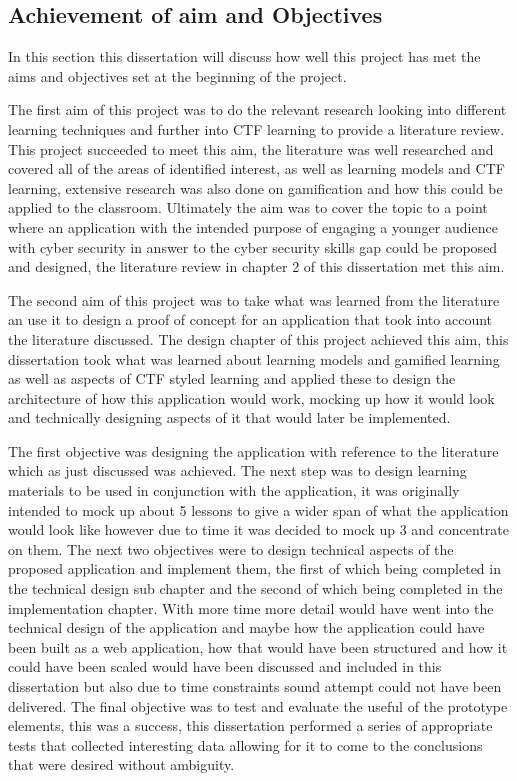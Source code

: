 \documentclass[12pt,a4paper]{article}
\begin{document}
\subsection{Achievement of aim and Objectives}  
In this section this dissertation will discuss how well this project has met the aims and objectives set at the beginning of the project.  

The first aim of this project was to do the relevant research looking into different learning techniques and further into CTF learning to provide a literature review. This project succeeded to meet this aim, the literature was well researched and covered all of the areas of identified interest, as well as learning models and CTF learning, extensive research was also done on gamification and how this could be applied to the classroom. Ultimately the aim was to cover the topic to a point where an application with the intended purpose of engaging a younger audience with cyber security in answer to the cyber security skills gap could be proposed and designed, the literature review in chapter 2 of this dissertation met this aim.   

The second aim of this project was to take what was learned from the literature an use it to design a proof of concept for an application that took into account the literature discussed. The design chapter of this project achieved this aim, this dissertation took what was learned about learning models and gamified learning as well as aspects of CTF styled learning and applied these to design the architecture of how this application would work, mocking up how it would look and technically designing aspects of it that would later be implemented. 

The first objective was designing the application with reference to the literature which as just discussed was achieved. The next step was to design learning materials to be used in conjunction with the application, it was originally intended to mock up about 5 lessons to give a wider span of what the application would look like however due to time it was decided to mock up 3 and concentrate on them. The next two objectives were to design technical aspects of the proposed application and implement them, the first of which being completed in the technical design sub chapter and the second of which being completed in the implementation chapter. With more time more detail would have went into the technical design of the application and maybe how the application could have been built as a web application, how that would have been structured and how it could have been scaled would have been discussed and included in this dissertation but also due to time constraints sound attempt could not have been delivered. The final objective was to test and evaluate the useful of the prototype elements, this was a success, this dissertation performed a series of appropriate tests that collected interesting data allowing for it to come to the conclusions that were desired without ambiguity.  
\end{document}
